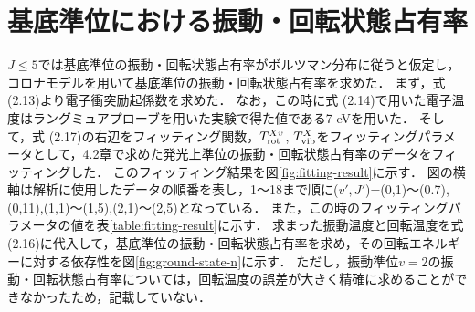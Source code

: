 \section{基底準位における振動・回転状態占有率}
$J \leq 5$では基底準位の振動・回転状態占有率がボルツマン分布に従うと仮定し，コロナモデルを用いて基底準位の振動・回転状態占有率を求めた．
まず，式 (2.13)より電子衝突励起係数を求めた．
なお，この時に式 (2.14)で用いた電子温度はラングミュアプローブを用いた実験で得た値である7 eV\cite{yun}を用いた．
そして，式 (2.17)の右辺をフィッティング関数，$T^{Xv}_{\rm rot}$, $T^X_{\rm vib}$をフィッティングパラメータとして，4.2章で求めた発光上準位の振動・回転状態占有率のデータをフィッティングした．
このフィッティング結果を図\ref{fig:fitting-result}に示す．
図の横軸は解析に使用したデータの順番を表し，1〜18まで順に($v',J'$)=(0,1)〜(0.7),(0,11),(1,1)〜(1,5),(2,1)〜(2,5)となっている．
また，この時のフィッティングパラメータの値を表\ref{table:fitting-result}に示す．
求まった振動温度と回転温度を式 (2.16)に代入して，基底準位の振動・回転状態占有率を求め，その回転エネルギーに対する依存性を図\ref{fig:ground-state-n}に示す．
ただし，振動準位$v=2$の振動・回転状態占有率については，回転温度の誤差が大きく精確に求めることができなかったため，記載していない．